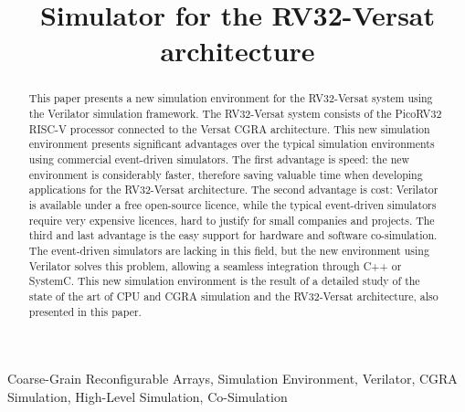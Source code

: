 \documentclass[conference]{IEEEtran}
\begin{document}
	


\title{Simulator for the RV32-Versat architecture\\ }

\author{
}

\maketitle

\begin{abstract}
This paper presents a new simulation environment for the RV32-Versat system
using the Verilator simulation framework. The RV32-Versat system consists of the
PicoRV32 RISC-V processor connected to the Versat \ac{CGRA} architecture. This new 
simulation environment presents significant advantages over
the typical simulation environments using commercial event-driven
simulators. The first advantage is speed: the new environment is considerably
faster, therefore saving valuable time when developing applications for the
RV32-Versat architecture. The second advantage is cost: Verilator is available
under a free open-source licence, while the typical event-driven simulators
require very expensive licences, hard to justify for small companies and
projects. The third and last advantage is the easy support for hardware and
software co-simulation. The event-driven simulators are lacking in this field,
but the new environment using Verilator solves this problem, allowing a seamless
integration through C++ or SystemC. This new simulation environment is the
result of a detailed study of the state of the art of \ac{CPU} and \ac{CGRA}
simulation and the RV32-Versat architecture, also presented in this paper.
\end{abstract}

\begin{IEEEkeywords}
Coarse-Grain Reconfigurable Arrays, Simulation Environment,
Verilator, CGRA Simulation, High-Level Simulation,
Co-Simulation
\end{IEEEkeywords}

\end{document}
